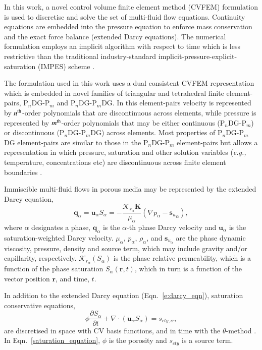 \documentclass[preprint,12pt]{elsarticle}
\newcommand{\PN}[2][error]{P$_{#1}$DG-P$_{#2}$}
\newcommand{\PNDG}[2][error]{P$_{#1}$DG-P$_{#2}$DG}
\newcommand{\eg}{{\it e.g., }}
\begin{document}
In this work, a novel control volume finite element method (CVFEM) formulation is used to discretise and solve the set of multi-fluid flow equations. Continuity equations are embedded into the pressure equation to enforce mass conservation and the exact force balance (extended Darcy equations). The numerical formulation employs an implicit algorithm with respect to time which is less restrictive than the traditional industry-standard implicit-pressure-explicit-saturation (IMPES) scheme \cite{aziz_1986,geiger_2004}.

The formulation used in this work uses a dual consistent CVFEM representation which is embedded in novel families of triangular and tetrahedral finite element-pairs, \PN[n]{m} and \PNDG[n]{m}. In this element-pairs velocity is represented by $n^{\rm th}$-order polynomials that are discontinuous across elements, while pressure is represented by $m^{\rm th}$-order polynomials that may be either continuous (\PN[n]{m}) or discontinuous (\PNDG[n]{m}) across elements. Most properties of \PNDG[n]{m} element-pairs are similar to those in the \PN[n]{m} element-pairs but allows a representation in which pressure, saturation and other solution variables (\eg temperature, concentrations etc) are discontinuous across finite element boundaries \cite{salinas_2018,adam_2016}.

Immiscible multi-fluid flows in porous media may be represented by the extended Darcy equation,
\begin{equation}\label{e:darcy_eqn}
  \mathbf{q}_{\alpha} = \mathbf{u}_{\alpha}S_\alpha=
  -\frac{\mathcal{K}_{{r}_\alpha}\mathbf{K}}{\mu_{\alpha}}\left(
  \nabla p_{\alpha} - {\mathbf{s}_{u}}_{\alpha} \right),
\end{equation}
where $\alpha$ designates a phase, $\mathbf{q}_{\alpha}$ is the $\alpha$-th phase Darcy velocity and $\mathbf{u}_{\alpha}$ is the saturation-weighted Darcy velocity. $\mu_{\alpha}$, $p_{\alpha}$, $\rho_{\alpha}$, and $\mathbf{s}_{{u}_\alpha}$ are the phase dynamic viscosity, pressure, density and source term, which may include gravity and/or capillarity, respectively. $\mathcal{K}_{{r}_\alpha}\left(S_{\alpha}\right)$ is the phase relative permeability, which is a function of the phase saturation $S_{\alpha}\left(\mathbf{r},t\right)$, which in turn is a function of the vector position $\mathbf{r}$, and time, $t$.

In addition to the extended Darcy equation (Eqn.~\ref{e:darcy_eqn}), saturation conservative equations,
\begin{equation}
  \phi\displaystyle\frac{\partial S_{\alpha} }{\partial t} + \nabla
  \cdot \left( {\mathbf u}_{\alpha} S_{\alpha}\right) =
  s_{cty,\alpha},
  \label{saturation_equation}
\end{equation}
are discretised in space with CV basis functions, and in time with the $\theta$-method \cite{pavlidis_2013b}. In Eqn.~\ref{saturation_equation}, $\phi$ is the porosity and $s_{cty}$ is a source term.
\end{document}
